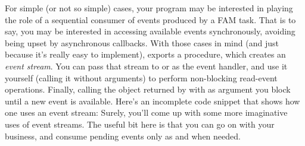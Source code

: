 For simple (or not so simple) cases, your program may be interested in
playing the role of a sequential consumer of events produced by a FAM
task. That is to say, you may be interested in accessing available
events synchronously, avoiding being upset by asynchronous callbacks.
With those cases in mind (and just because it's really easy to
implement), 
exports a procedure,  which creates an
\textit{event stream}. You can pass that stream to
 or  as the event handler,
and use it yourself (calling it without arguments) to perform
non-blocking read-event operations. Finally, calling the object
returned by  with  as argument you
block until a new event is available. Here's an incomplete code
snippet that shows how one uses an event stream:
Surely, you'll come up with some more imaginative uses of event
streams. The useful bit here is that you can go on with your business,
and consume pending events only as and when needed.

